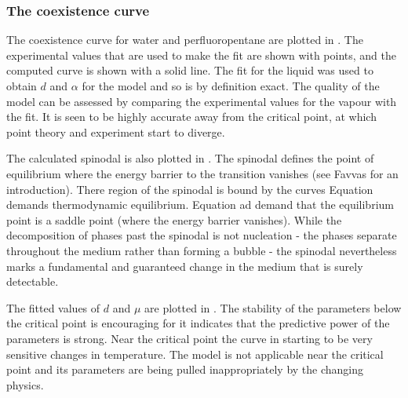 \subsubsection{The coexistence curve}

The coexistence curve for water and perfluoropentane are plotted in .
The experimental values that are used to make the fit are shown with points,
and the computed curve is shown with a solid line.  
The fit for the liquid was  used to obtain $d$ and $\alpha$ for the model and so is by definition exact.
The quality of the model can be assessed by comparing the experimental values for the vapour with the fit.
It is seen to be highly accurate away from the critical point, 
at which point theory and experiment start to diverge.


The calculated spinodal is also plotted in .
The spinodal defines the point of equilibrium where the energy barrier to the transition vanishes (see Favvas\cite{Favvas2008} for an introduction).
There region of the spinodal is bound by the curves
Equation   demands thermodynamic equilibrium.
Equation   ad    demand that the equilibrium point is a saddle point (where the energy barrier vanishes).
%
While the decomposition of phases past the spinodal is not  nucleation -
the phases separate throughout the medium rather than forming a bubble -
the spinodal nevertheless marks a fundamental and guaranteed  change in the medium that is surely detectable.

The fitted values of $d$ and $\mu$ are plotted in .
The stability of the parameters below the critical point is encouraging
for it indicates that the predictive power of the parameters is strong.
Near the critical point the curve in 
starting to be very sensitive changes in temperature.
The model is not applicable near the critical point 
and its parameters are being pulled inappropriately by the changing 
physics.


